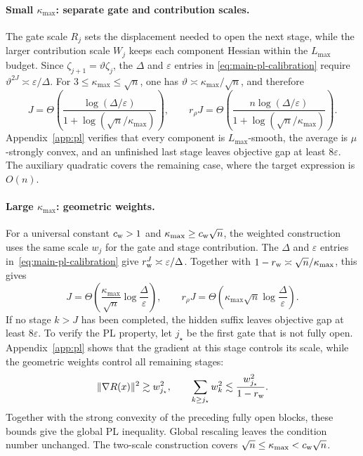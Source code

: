 \documentclass{article}
\theoremstyle{definition}
\begin{document}
\paragraph{Small $\kappa_{\max}$: separate gate and contribution scales.}
The gate scale $R_j$ sets the displacement needed to open the next stage, while
the larger contribution scale $W_j$ keeps each component Hessian within the
$L_{\max}$ budget.
Since $\zeta_{j+1}=\vartheta\zeta_j$, the $\Delta$ and $\varepsilon$ entries in
\eqref{eq:main-pl-calibration} require
$\vartheta^{2J}\asymp\varepsilon/\Delta$.  For
$3\le\kappa_{\max}\le\sqrt n$, one has
$\vartheta\asymp\kappa_{\max}/\sqrt n$, and therefore
\begin{equation}
 J=\Theta\!\left(
 \frac{\log(\Delta/\varepsilon)}
 {1+\log(\sqrt n/\kappa_{\max})}\right),
 \qquad
 r_\rho J=\Theta\!\left(
 \frac{n\log(\Delta/\varepsilon)}
 {1+\log(\sqrt n/\kappa_{\max})}\right).
 \label{eq:main-small-kappa-lower}
\end{equation}
Appendix~\ref{app:pl} verifies that every component is $L_{\max}$-smooth, the
average is $\mu$-strongly convex, and an unfinished last stage leaves objective
gap at least $8\varepsilon$.  The auxiliary quadratic covers the remaining
case, where the target expression is $O(n)$.

\paragraph{Large $\kappa_{\max}$: geometric weights.}
For a universal constant $c_{\rm w}>1$ and
$\kappa_{\max}\ge c_{\rm w}\sqrt n$, the weighted construction uses the same
scale $w_j$ for the gate and stage contribution.  The $\Delta$ and
$\varepsilon$ entries in~\eqref{eq:main-pl-calibration} give
$r_{\rm w}^J\asymp\varepsilon/\Delta$.  Together with
$1-r_{\rm w}\asymp\sqrt n/\kappa_{\max}$, this gives
\begin{equation}
 J=\Theta\!\left(\frac{\kappa_{\max}}{\sqrt n}
 \log\frac{\Delta}{\varepsilon}\right),
 \qquad
 r_\rho J=\Theta\!\left(\kappa_{\max}\sqrt n
 \log\frac{\Delta}{\varepsilon}\right).
 \label{eq:main-large-kappa-lower}
\end{equation}
If no stage $k>J$ has been completed, the hidden suffix leaves objective gap at
least $8\varepsilon$.  To verify the PL property, let $j_\star$ be the first
gate that is not fully open.  Appendix~\ref{app:pl} shows that the gradient at
this stage controls its scale, while the geometric weights control all
remaining stages:
\begin{equation}
 \|\nabla R(x)\|^2\gtrsim w_{j_\star}^2,
 \qquad
 \sum_{k\ge j_\star}w_k^2
 \lesssim\frac{w_{j_\star}^2}{1-r_{\rm w}}.
 \label{eq:main-weighted-barrier-tail}
\end{equation}
Together with the strong convexity of the preceding fully open blocks, these
bounds give the global PL inequality.  Global rescaling leaves the condition
number unchanged.
The two-scale construction covers
$\sqrt n\le\kappa_{\max}<c_{\rm w}\sqrt n$.
\end{document}
